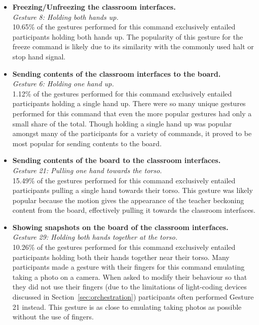 \documentclass[link]{IWCOMP}
\begin{document}
\begin{itemize}
\item \textbf{Freezing/Unfreezing the classroom interfaces.}\\
\textit{Gesture 8: Holding both hands up.}\\  
10.65\% of the gestures performed for this command exclusively entailed participants holding both hands up.
The popularity of this gesture for the freeze command is likely due to its similarity with the commonly used halt or stop hand signal.\\

\item \textbf{Sending contents of the classroom interfaces to the board.}\\
\textit{Gesture 6: Holding one hand up.}\\
1.12\% of the gestures performed for this command exclusively entailed participants holding a single hand up.
There were so many unique gestures performed for this command that even the more popular gestures had only a small share of the total.
Though holding a single hand up was popular amongst many of the participants for a variety of commands, it proved to be most popular for sending contents to the board.\\

\item \textbf{Sending contents of the board to the classroom interfaces.}\\
\textit{Gesture 21: Pulling one hand towards the torso.}\\
15.49\% of the gestures performed for this command exclusively entailed participants pulling a single hand towards their torso.
This gesture was likely popular because the motion gives the appearance of the teacher beckoning content from the board, effectively pulling it towards the classroom interfaces.\\

\item \textbf{Showing snapshots on the board of the classroom interfaces.}\\
\textit{Gesture 29: Holding both hands together at the torso.}\\
10.26\% of the gestures performed for this command exclusively entailed participants holding both their hands together near their torso.
Many participants made a gesture with their fingers for this command emulating taking a photo on a camera.
When asked to modify their behaviour so that they did not use their fingers (due to the limitations of light-coding devices discussed in Section~\ref{sec:orchestration}) participants often performed Gesture 21 instead.
This gesture is as close to emulating taking photos as possible without the use of fingers.\\


\end{itemize}
\end{document}
